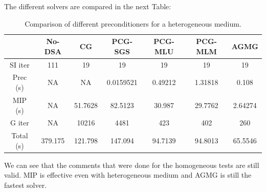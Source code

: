 The different solvers are compared in the next Table:
\begin{table}[H]
\begin{center}
\caption{Comparison of different preconditioners for a heterogeneous medium.}
\begin{tabular}{|c|c|c|c|c|c|c|}
\hline
 & No-DSA & CG & PCG-SGS & PCG-MLU & PCG-MLM & AGMG\\
\hline
  SI iter & 111     & 19      & 19        & 19      & 19      & 19 \\
 Prec (s) & NA      & NA      & 0.0159521 & 0.49212 & 1.31818 & 0.108 \\
  MIP (s) & NA      & 51.7628 & 82.5123   & 30.987  & 29.7762 & 2.64274 \\
   G iter & NA      & 10216   & 4481      & 423     & 402     & 260 \\
Total (s) & 379.175 & 121.798 & 147.094   & 94.7139 & 94.8013 & 65.5546 \\
\hline
\end{tabular}
\end{center}
\end{table}
We can see that the comments that were done for the homogeneous tests are
still valid. MIP is effective even with heterogeneous medium and AGMG is
still the fastest solver.
